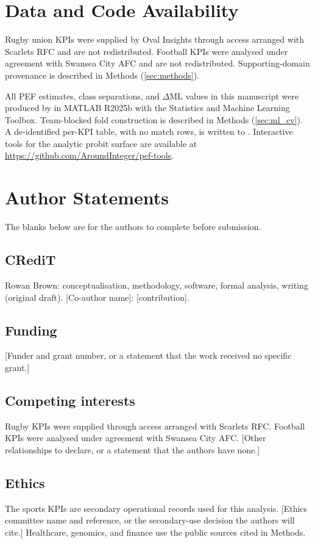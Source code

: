 \section{Data and Code Availability}
\label{sec:data_availability}

Rugby union KPIs were supplied by Oval Insights through access arranged with Scarlets RFC and are not redistributed. Football KPIs were analysed under agreement with Swansea City AFC and are not redistributed. Supporting-domain provenance is described in Methods (\cref{sec:methods}).

All PEF estimates, class separations, and $\Delta\mathrm{ML}$ values in this manuscript were produced by  in {MATLAB} {R2025b} with the Statistics and Machine Learning Toolbox. Team-blocked fold construction is described in Methods (\cref{sec:ml_cv}). A de-identified per-KPI table, with no match rows, is written to . Interactive tools for the analytic probit surface are available at \url{https://github.com/AroundInteger/pef-tools}.

\section{Author Statements}
\label{sec:author_statements}

The blanks below are for the authors to complete before submission.

\subsection{CRediT}

Rowan Brown: conceptualisation, methodology, software, formal analysis, writing (original draft). [Co-author name]: [contribution].

\subsection{Funding}

[Funder and grant number, or a statement that the work received no specific grant.]

\subsection{Competing interests}

Rugby KPIs were supplied through access arranged with Scarlets RFC. Football KPIs were analysed under agreement with Swansea City AFC. [Other relationships to declare, or a statement that the authors have none.]

\subsection{Ethics}

The sports KPIs are secondary operational records used for this analysis. [Ethics committee name and reference, or the secondary-use decision the authors will cite.] Healthcare, genomics, and finance use the public sources cited in Methods.
